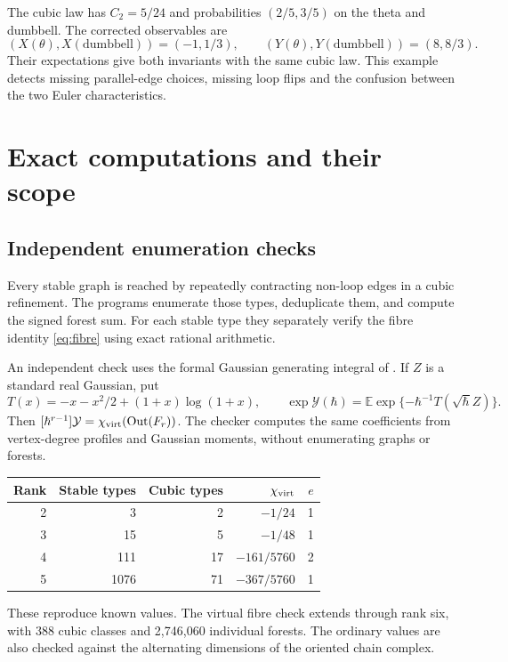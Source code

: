 \documentclass[11pt]{article}
\theoremstyle{definition}
\newcommand{\Out}{\operatorname{Out}}
\newcommand{\E}{\mathbb E}
\numberwithin{equation}{section}
\begin{document}
The cubic law has $C_2=5/24$ and probabilities $(2/5,3/5)$ on
the theta and dumbbell. The corrected observables are
\[
 (X(\theta),X(\mathrm{dumbbell}))=(-1,1/3),\qquad
 (Y(\theta),Y(\mathrm{dumbbell}))=(8,8/3).
\]
Their expectations give both invariants with the same cubic law.
This example detects missing parallel-edge choices, missing loop
flips and the confusion between the two Euler characteristics.

\section{Exact computations and their scope}

\subsection{Independent enumeration checks}
Every stable graph is reached by repeatedly contracting non-loop
edges in a cubic refinement. The programs enumerate those types,
deduplicate them, and compute the signed forest sum.
For each stable type they separately verify the fibre identity
\eqref{eq:fibre} using exact rational arithmetic.

An independent check uses the formal Gaussian generating integral
of \cite{BVQFT}. If $Z$ is a standard real Gaussian, put
\[
 T(x)=-x-x^2/2+(1+x)\log(1+x),\qquad
 \exp\mathcal Y(\hbar)=
       \E\exp\{-\hbar^{-1}T(\sqrt\hbar Z)\}.
\]
Then $[\hbar^{r-1}]\mathcal Y=\chi_{\rm virt}(\Out(F_r))$.
The checker computes the same coefficients from vertex-degree profiles
and Gaussian moments, without enumerating graphs or forests.

\begin{center}
\begin{tabular}{rrrrr}
\toprule
Rank & Stable types & Cubic types & $\chi_{\rm virt}$ & $e$\\
\midrule
2 & 3 & 2 & $-1/24$ & 1\\
3 & 15 & 5 & $-1/48$ & 1\\
4 & 111 & 17 & $-161/5760$ & 2\\
5 & 1076 & 71 & $-367/5760$ & 1\\
\bottomrule
\end{tabular}
\end{center}
These reproduce known values. The virtual fibre check extends through
rank six, with 388 cubic classes and 2,746,060 individual forests.
The ordinary values are also checked against the alternating dimensions
of the oriented chain complex.
\end{document}
